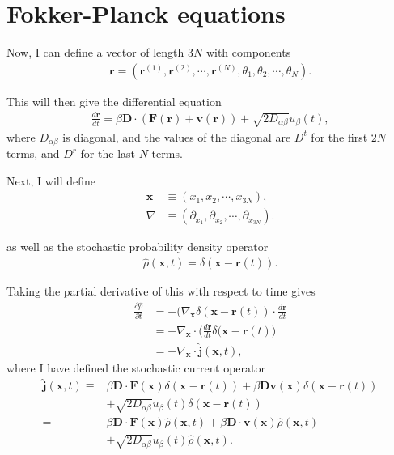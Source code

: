 \documentclass[twocolumn,amsmath,amssymb,aps]{revtex4-1}%
\begin{document}


\appendix

\section{Fokker-Planck equations\label{app:fokkerplanck}}

Now, I can define a vector of length $3N$ with components
\begin{align}
  \bm{r}=(\bm{r}^{(1)},\bm{r}^{(2)},\cdots,\bm{r}^{(N)},\theta_1,\theta_2,\cdots,
  \theta_N).
\end{align}

This will then give the differential equation
\begin{align}
  \frac{d\bm{r}}{dt}=\beta\bm{D}\cdot(\bm{F}(\bm{r})+\bm{v}(\bm{r}))
  +\sqrt{2D_{\alpha\beta}}u_{\beta}(t),
\end{align}
where $D_{\alpha\beta}$ is diagonal, and the values of the diagonal are
$D^t$ for the first $2N$ terms, and $D^r$ for the last $N$ terms.

Next, I will define
\begin{align}
  \bm{x}&\equiv(x_1,x_2,\cdots,x_{3N}),\\
  \nabla&\equiv(\partial_{x_1},\partial_{x_2},\cdots,\partial_{x_{3N}}).
\end{align}

as well as the stochastic probability density operator
\begin{align}
  \hat{\rho}(\bm{x},t)=\delta(\bm{x}-\bm{r}(t)).
\end{align}

Taking the partial derivative of this with respect to time gives
\begin{align}
  \frac{\partial\hat{\rho}}{\partial t}
  &=-(\nabla_{\bm{x}}\delta(\bm{x}-\bm{r}(t))
  \cdot\frac{d\bm{r}}{dt}\nonumber\\
  &=-\nabla_{\bm{x}}\cdot\bigg(\frac{d\bm{r}}{dt}
  \delta(\bm{x}-\bm{r}(t)\bigg)\nonumber\\
  &=-\nabla_{\bm{x}}\cdot\hat{\bm{j}}(\bm{x},t),
\end{align}
where I have defined the stochastic current operator
\begin{align}
  \hat{\bm{j}}(\bm{x},t)\equiv
  &\beta\bm{D}\cdot\bm{F}(\bm{x})\delta(\bm{x}-\bm{r}(t))
  +\beta\bm{D}\bm{v}(\bm{x})\delta(\bm{x}-\bm{r}(t))\nonumber\\
  &+\sqrt{2D_{\alpha\beta}}u_{\beta}(t)
  \delta(\bm{x}-\bm{r}(t))\nonumber\\
  =&\beta\bm{D}\cdot\bm{F}(\bm{x})\hat{\rho}(\bm{x},t)
  +\beta\bm{D}\cdot\bm{v}(\bm{x})\hat{\rho}(\bm{x},t)\nonumber\\
  &+\sqrt{2D_{\alpha\beta}}u_{\beta}(t)\hat{\rho}(\bm{x},t).
\end{align}
\end{document}
